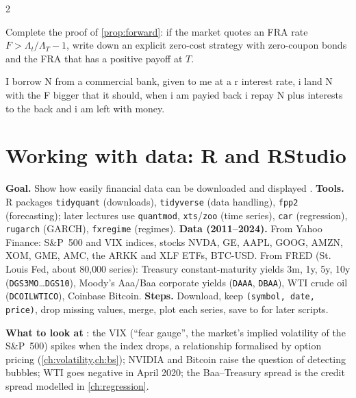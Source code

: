 \begin{paracol}{2}
\begin{exercise}\label{ex:fra}
Complete the proof of \cref{prop:forward}: if the market quotes an FRA rate $F > \Lambda_t/\Lambda_T - 1$, write
down an explicit zero-cost strategy with zero-coupon bonds and the FRA that has a positive payoff at $T$.
\end{exercise}
\begin{mysolution}
      I borrow N from a commercial bank, given to me at a r interest rate, i land N with the F bigger that it should, when i am payied back i repay N plus interests to the back and i am left with money.
\end{mysolution}

\section{Working with data: R and RStudio}\label{sec:R}

\begin{casestudy}
\textbf{Goal.} Show how easily financial data can be downloaded and displayed
. \textbf{Tools.} R packages \texttt{tidyquant} (downloads), \texttt{tidyverse}
(data handling), \texttt{fpp2} (forecasting); later lectures use \texttt{quantmod}, \texttt{xts}/\texttt{zoo}
(time series), \texttt{car} (regression), \texttt{rugarch} (GARCH), \texttt{fxregime} (regimes).
\textbf{Data (2011--2024).} From Yahoo Finance: S\&P~500 and VIX indices, stocks NVDA, GE, AAPL, GOOG,
AMZN, XOM, GME, AMC, the ARKK and XLF ETFs, BTC-USD. From FRED (St.\,Louis Fed, about 80{,}000
series): Treasury constant-maturity yields 3m, 1y, 5y, 10y (\texttt{DGS3MO}\dots\texttt{DGS10}),
Moody's Aaa/Baa corporate yields (\texttt{DAAA}, \texttt{DBAA}), WTI crude oil (\texttt{DCOILWTICO}),
Coinbase Bitcoin. \textbf{Steps.} Download, keep \texttt{(symbol, date, price)}, drop missing values,
merge, plot each series, save to  for later scripts.

\smallskip
\textbf{What to look at} : the VIX (``fear gauge'', the market's implied
volatility of the S\&P~500) spikes when the index drops, a relationship formalised by option
pricing (\cref{ch:volatility,ch:bs}); NVIDIA and Bitcoin raise the question of detecting bubbles;
WTI goes negative in April 2020; the Baa--Treasury spread is the credit spread modelled in
\cref{ch:regression}.
\end{casestudy}


\end{paracol}
